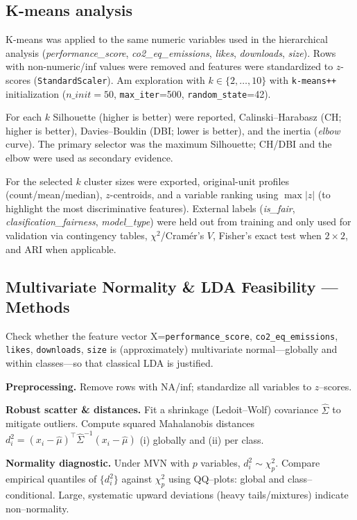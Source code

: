 \documentclass[journal]{IEEEtran}
\begin{document}
\subsection{K-means analysis}
K-means was applied to the same numeric variables used in the hierarchical analysis
(\textit{performance\_score}, \textit{co2\_eq\_emissions}, \textit{likes}, \textit{downloads}, \textit{size}).
Rows with non-numeric/inf values were removed and features were standardized to $z$-scores
(\texttt{StandardScaler}). Am exploration with $k\in\{2,\ldots,10\}$ with \texttt{k-means++} 
initialization ($n\_init=50$, \texttt{max\_iter}=500, \texttt{random\_state}=42).

For each $k$ Silhouette (higher is better) were reported, Calinski–Harabasz (CH; higher is better),
Davies–Bouldin (DBI; lower is better), and the inertia (\emph{elbow} curve).
The primary selector was the maximum Silhouette; CH/DBI and the elbow were used as
secondary evidence.

For the selected $k$ cluster sizes were exported, original-unit profiles (count/mean/median),
$z$-centroids, and a variable ranking using $\max|z|$ (to highlight the most discriminative features).
External labels (\textit{is\_fair}, \textit{clasification\_fairness}, \textit{model\_type})
were held out from training and only used for validation via contingency tables,
$\chi^2$/Cramér’s $V$, Fisher’s exact test when $2\times 2$, and ARI when applicable.


\subsection{Multivariate Normality \& LDA Feasibility — Methods}
\label{sec:method-lda}

Check whether the feature vector
X=\texttt{performance\_score}, \texttt{co2\_eq\_emissions}, \texttt{likes}, \texttt{downloads}, \texttt{size}
is (approximately) multivariate normal—globally and within classes—so that classical LDA is justified.

\textbf{Preprocessing.} Remove rows with NA/inf; standardize all variables to $z$–scores.

\textbf{Robust scatter \& distances.} Fit a shrinkage (Ledoit–Wolf) covariance
$\widehat{\Sigma}$ to mitigate outliers. Compute squared Mahalanobis distances
$d_i^2=(x_i-\widehat{\mu})^\top\widehat{\Sigma}^{-1}(x_i-\widehat{\mu})$ (i) globally and
(ii) per class.

\textbf{Normality diagnostic.} Under MVN with $p$ variables, $d_i^2\sim\chi^2_p$.
Compare empirical quantiles of $\{d_i^2\}$ against $\chi^2_p$ using QQ–plots:
global and class–conditional. Large, systematic upward deviations (heavy tails/mixtures) indicate
non–normality.
\end{document}
